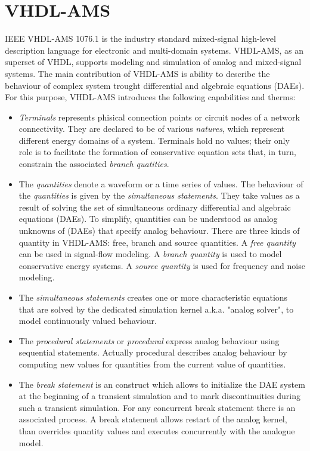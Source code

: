 \documentclass{article}
\begin{document}
\section{VHDL-AMS}
\label{sec:vhdlams}
IEEE VHDL-AMS 1076.1 is the industry standard mixed-signal
high-level description language for electronic and multi-domain
systems. VHDL-AMS, as an superset of VHDL, supports modeling and
simulation of analog and mixed-signal systems. The main contribution
of VHDL-AMS is ability to describe the behaviour of complex system
trought differential and algebraic equations (DAEs). For this purpose,
VHDL-AMS introduces the following capabilities and therms:

\begin{itemize}
\item
\emph{Terminals} represents phisical connection points or circuit nodes
of a network connectivity. They are declared to be of various
\emph{natures}, which represent different energy domains of a system.
Terminals hold no values; their only role is to facilitate the formation
of conservative equation sets that, in turn, constrain the associated
\emph{branch quatities}.
\item
The \emph{quantities} denote a waveform or a time series of values.
The behaviour of the \emph{quantities} is given by the \emph{simultaneous
 statements}. They take values as a result of solving the set of simultaneous
ordinary differential and algebraic equations (DAEs). To simplify,
quantities can be understood as analog unknowns of (DAEs) that specify
analog behaviour. There are three kinds of quantity in VHDL-AMS: free,
branch and source quantities. A \emph{free quantity} can be used in
signal-flow modeling. A \emph{branch quantity} is used to model conservative energy
systems. A \emph{source quantity} is used for frequency and noise modeling.
\item
The \emph{simultaneous statements} creates one or more characteristic
equations that are solved by the dedicated simulation kernel a.k.a.
"analog solver", to model continuously valued behaviour. 
\item
The \emph{procedural statements} or \emph{procedural} express analog behaviour
using sequential statements. Actually procedural describes analog behaviour
by computing new values for quantities from the current value of quantities.
\item
The \emph{break statement} is an construct which allows to
initialize the DAE system at the beginning of a transient
simulation and to mark discontinuities during such a transient
simulation. For any concurrent break statement there is an associated process.
A break statement allows restart of the analog kernel,
than overrides quantity values and executes concurrently with the analogue model.

\end{itemize}
 
\end{document}

